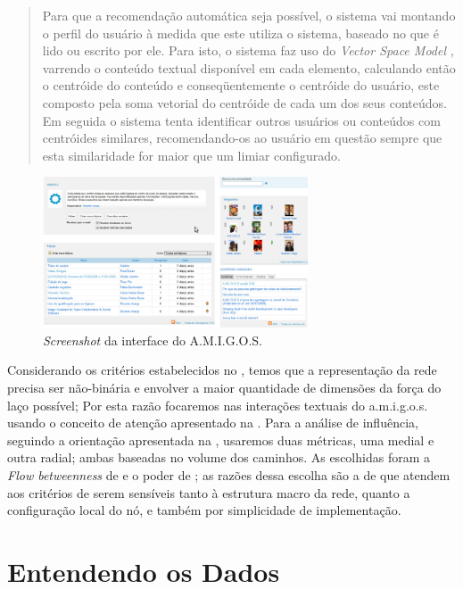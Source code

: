 \begin{quote}{\citep{RicardoAraujoCosta2008}}
\begin{description}
	Para que a recomendação automática seja possível, o sistema vai montando o
	perfil do usuário à medida que este utiliza o sistema, baseado no que é lido ou
	escrito por ele. Para isto, o sistema faz uso do \emph{Vector Space Model}
	\citep{Barros2002}, varrendo o conteúdo textual disponível em cada elemento,
	calculando então o centróide do conteúdo e conseqüentemente o centróide do
	usuário, este composto pela soma vetorial do centróide de cada um dos seus
	conteúdos. Em seguida o sistema tenta identificar outros usuários ou conteúdos
	com centróides similares, recomendando-os ao usuário em questão sempre que
	esta similaridade for maior que um limiar configurado.
	\end{description}
\end{quote}

\begin{figure}[h!]
  \centering
    \includegraphics[width=0.7\textwidth]{imgs/screenshot-amigos.png}
  \caption{\emph{Screenshot} da interface do A.M.I.G.O.S.}
    \label{ap:fig:screenshot}
\end{figure}

Considerando os critérios estabelecidos no , temos que a
representação da rede precisa ser não-binária e envolver a maior quantidade de
dimensões da força do laço possível; Por esta razão focaremos nas interações
textuais do a.m.i.g.o.s. usando o conceito de atenção apresentado na
. Para a análise de influência, seguindo a orientação
apresentada na , usaremos duas métricas, uma medial e
outra radial; ambas baseadas no volume dos caminhos. As escolhidas foram a
\emph{Flow betweenness} de \citeauthor{Freeman1991} e o poder de
\citeauthor{Bonacich1987}; as razões dessa escolha são a de que atendem aos
critérios de serem sensíveis tanto à estrutura macro da rede, quanto a
configuração local do nó, e também por simplicidade de implementação.

 

\section{Entendendo os Dados}
\label{ap:sec:dados}


